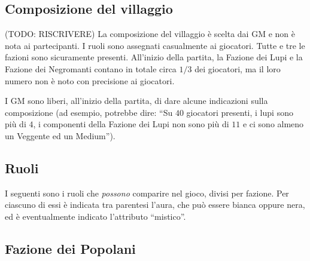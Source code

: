 \documentclass[a4paper,10pt]{article}
\begin{document}
\subsection{Composizione del villaggio}

(TODO: RISCRIVERE)
La composizione del villaggio è scelta dai GM e non è nota ai partecipanti. I ruoli sono assegnati casualmente ai giocatori.
Tutte e tre le fazioni sono sicuramente presenti. All'inizio della partita, la Fazione dei Lupi e la Fazione dei Negromanti contano in totale circa $1/3$ dei giocatori, ma il loro numero non è noto con precisione ai giocatori.

I GM sono liberi, all'inizio della partita, di dare alcune indicazioni sulla composizione (ad esempio, potrebbe dire: ``Su $40$ giocatori presenti, i lupi sono più di $4$, i componenti della Fazione dei Lupi non sono più di $11$ e ci sono almeno un Veggente ed un Medium'').


\subsection{Ruoli}



I seguenti sono i ruoli che \emph{possono} comparire nel gioco, divisi per fazione.
Per ciascuno di essi è indicata tra parentesi l'aura, che può essere bianca oppure nera, ed è eventualmente indicato l'attributo ``mistico''.


\subsection*{Fazione dei Popolani}
\end{document}
